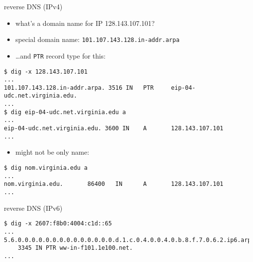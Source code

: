 \begin{frame}[fragile]{reverse DNS (IPv4)}
\begin{itemize}
\item what's a domain name for IP 128.143.107.101?
\item special domain name: \texttt{101.107.143.128.in-addr.arpa}
\item \ldots and \texttt{PTR} record type for this:
\end{itemize}
\begin{Verbatim}[fontsize=\fontsize{9}{10}]
$ dig -x 128.143.107.101
...
101.107.143.128.in-addr.arpa. 3516 IN   PTR     eip-04-udc.net.virginia.edu.
...
$ dig eip-04-udc.net.virginia.edu a
...
eip-04-udc.net.virginia.edu. 3600 IN    A       128.143.107.101
...
\end{Verbatim}
\begin{itemize}
\item might not be only name:
\end{itemize}
\begin{Verbatim}[fontsize=\fontsize{9}{10}]
$ dig nom.virginia.edu a
...
nom.virginia.edu.       86400   IN      A       128.143.107.101
...
\end{Verbatim}
\end{frame}

\begin{frame}[fragile]{reverse DNS (IPv6)}
\begin{Verbatim}[fontsize=\fontsize{9}{10}]
$ dig -x 2607:f8b0:4004:c1d::65
...
5.6.0.0.0.0.0.0.0.0.0.0.0.0.0.0.d.1.c.0.4.0.0.4.0.b.8.f.7.0.6.2.ip6.arpa.
    3345 IN PTR ww-in-f101.1e100.net.
...
\end{Verbatim}
\end{frame}
